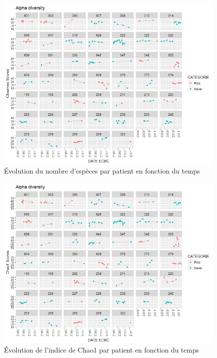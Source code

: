 \documentclass[12pt,a4paper]{article}
\begin{document}
\begin{figure}
\begin{center}
\includegraphics[scale=0.80]{img/alpha_observed.png}\hfill
\end{center}
\caption{Évolution du nombre d'espèces par patient en fonction du temps}
\label{alphaObs}
\end{figure}


\begin{figure}
\begin{center}
\includegraphics[scale=0.80]{img/alpha_chao1.png}\hfill
\end{center}
\caption{Évolution de l'indice de Chao1 par patient en fonction du temps}
\label{alphaChao1}
\end{figure}
\end{document}
